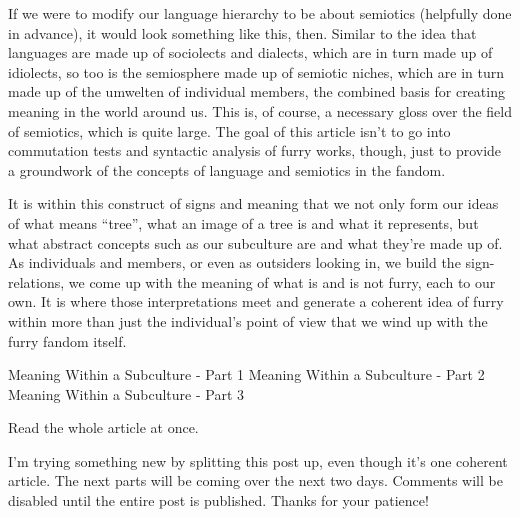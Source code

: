  If we were to modify our language hierarchy to be about semiotics (helpfully done in advance), it would look something like this, then. Similar to the idea that languages are made up of sociolects and dialects, which are in turn made up of idiolects, so too is the semiosphere made up of semiotic niches, which are in turn made up of the umwelten of individual members, the combined basis for creating meaning in the world around us. This is, of course, a necessary gloss over the field of semiotics, which is quite large. The goal of this article isn't to go into commutation tests and syntactic analysis of furry works, though, just to provide a groundwork of the concepts of language and semiotics in the fandom.

It is within this construct of signs and meaning that we not only form our ideas of what means ``tree'', what an image of a tree is and what it represents, but what abstract concepts such as our subculture are and what they're made up of. As individuals and members, or even as outsiders looking in, we build the sign-relations, we come up with the meaning of what is and is not furry, each to our own. It is where those interpretations meet and generate a coherent idea of furry within more than just the individual's point of view that we wind up with the furry fandom itself.

Meaning Within a Subculture - Part 1 Meaning Within a Subculture - Part 2 Meaning Within a Subculture - Part 3

Read the whole article at once.

I'm trying something new by splitting this post up, even though it's one coherent article. The next parts will be coming over the next two days. Comments will be disabled until the entire post is published. Thanks for your patience!

